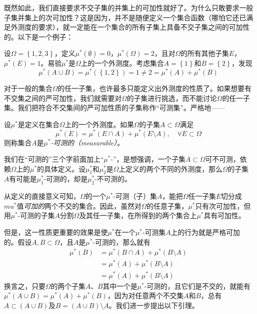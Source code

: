 \documentclass[main.tex]{subfiles}
\begin{document}
既然如此，我们直接要求不交子集的并集上的可加性就好了。为什么只敢要求一般子集并集上的次可加性？这是因为，并不是随便定义一个集合函数（哪怕它还已满足外测度的要求），就一定能在一个集合的所有子集上具备不交子集之间的可加性的。以下是一个例子：

\begin{example}
    设$\Omega=\left\{1,2,3\right\}$，定义$\mu^*\left(\emptyset\right)=0$，$\mu^*\left(\Omega\right)=2$，且对$\Omega$的所有其他子集$E$，$\mu^*\left(E\right)=1$。易验$\mu^*$是$\Omega$上的一个外测度。考虑集合$A=\left\{1\right\}$和$B=\left\{2\right\}$，发现
    \[\mu^*\left(A\cup B\right)=\mu^*\left(\left\{1,2\right\}\right)=1\neq2=\mu^*\left(A\right)+\mu^*\left(B\right)\]
\end{example}

对于一般的集合$\Omega$的任一子集，也许最多只能定义出外测度的性质了。如果想要有不交集之间的严可加性，我们就需要对$\Omega$的子集进行挑选，而不能讨论$\Omega$的任一子集。我们把符合不交集间的严可加性质的子集称作“可测集”。严格地——

\begin{definition}[可测集]
    设$\mu^*$是定义在集合$\Omega$上的一个外测度。如果$\Omega$的子集$A\subset \Omega$满足
    \[\mu^*\left(E\right)=\mu^*\left(E\cap A\right)+\mu^*\left(E\setminus A\right),\quad\forall E\subset\Omega\]
    则称集合$A$是\emph{$\mu^*$-可测的（measurable）}。
\end{definition}

我们在“可测的”三个字前面加上“$\mu^*$-”，是想强调，一个子集$A\subset\Omega$可不可测，依赖$\Omega$上的$\mu^*$的具体定义。设$\mu_1^*$和$\mu_2^*$是$\Omega$上定义的两个不同的外测度，那么$\Omega$的子集$A$有可能是$\mu_1^*$-可测的，却是$\mu_2^*$-不可测的。

从定义的直接意义可知，$\Omega$的一个$\mu^*$-可测（子）集$A$，能把$\Omega$任一子集$E$切分成$mu^*$值\emph{可加的}两个不交的集合。因此，虽然对$\Omega$的任意子集，$\mu^*$只有次可加性，但用$\mu^*$-可测的子集$A$分割$\Omega$及其任一子集，在所得到的两个集合上$\mu^*$具有可加性。

但是，这一性质更重要的效果是使$\mu^*$在一个$\mu^*$-可测集$A$上的行为就是严格可加的。假设$A,B\subset\Omega$，且$A$是$\mu^*$-可测的，那么就有
\begin{align*}
    \mu^*\left(B\right) & =\mu^*\left(B\cap A\right)+\mu^*\left(B\setminus A\right) \\
                        & =\mu^*\left(A\right)+\mu^*\left(B\setminus A\right)       \\
                        & =\mu^*\left(A\right)+\mu^*\left(B\setminus A\right)
\end{align*}
换言之，只要$\Omega$的两个子集$A$、$B$其中一个是$\mu^*$-可测的，且它们是不交的，就能有$\mu^*\left(A\cup B\right)=\mu^*\left(A\right)+\mu^*\left(B\right)$，因为对任意两个不交集$A$和$B$，总有$A\subset\left(A\cup B\right)$及$B=\left(A\cup B\right)\setminus A$。我们进一步提出以下引理。
\end{document}
